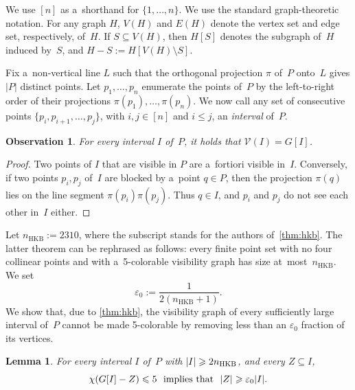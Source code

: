 \documentclass[11pt,a4paper]{article}
\newtheorem{lemma}{Lemma}
\newtheorem{observation}{Observation}
\newcommand{\vis}{\mathcal V}
\newcommand{\hkb}{n_{\mathrm{HKB}}}
\begin{document}
We use $[n]$ as a~shorthand for $\{1, \ldots, n\}$.
We use the standard graph-theoretic notation.
For any graph $H$, $V(H)$ and $E(H)$ denote the vertex set and edge set, respectively, of~$H$.
If $S \subseteq V(H)$, then $H[S]$ denotes the subgraph of~$H$ induced by~$S$, and $H-S := H[V(H) \setminus S]$.

Fix a~non-vertical line $L$ such that the orthogonal projection $\pi$ of~$P$ onto~$L$ gives $|P|$ distinct points.
Let $p_1, \ldots, p_n$ enumerate the points of~$P$ by the left-to-right order of their projections $\pi(p_1), \ldots, \pi(p_n)$.
We now call any set of consecutive points $\{p_i, p_{i+1}, \ldots, p_j\}$, with $i, j \in [n]$ and $i \leqslant j$, an \emph{interval} of~$P$.

\begin{observation}\label{obs:vis-interval}
  For every interval $I$ of~$P$, it holds that $\vis(I) = G[I]$.
\end{observation}

\begin{proof}
  Two points of $I$ that are visible in $P$ are a~fortiori visible in~$I$.
  Conversely, if two points $p_i, p_j$ of~$I$ are blocked by a~point $q \in P$, then the projection $\pi(q)$ lies on the line segment $\pi(p_i)\pi(p_j)$.
  Thus $q \in I$, and $p_i$ and $p_j$ do not see each other in~$I$ either.
\end{proof}

Let $\hkb := 2310$, where the subscript stands for the authors of~\cref{thm:hkb}.
The latter theorem can be rephrased as follows: every finite point set with no four collinear points and with a~5-colorable visibility graph has size at~most~$\hkb$. 
We set \[\varepsilon_0 := \frac{1}{2(\hkb+1)}.\] 
We show that, due to \cref{thm:hkb}, the visibility graph of every sufficiently large interval of~$P$ cannot be made 5-colorable by removing less than an $\varepsilon_0$ fraction of its vertices.  

\begin{lemma}\label{lem:distance-5-col}
  For every interval $I$ of~$P$ with $\abs{I} \geqslant 2 \hkb$, and every $Z \subseteq I$,
  \[\chi(G[I]-Z) \leqslant 5~~\text{implies that}~~\mathopen| Z \mathclose| \geqslant \varepsilon_0 \mathopen| I \mathclose|.\]
\end{lemma}
\end{document}
